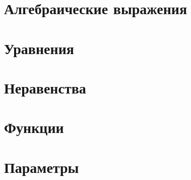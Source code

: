 \section{Алгебраические выражения}
	
\section{Уравнения}
	
\section{Неравенства}
\section{Функции}
	
\section{Параметры}


